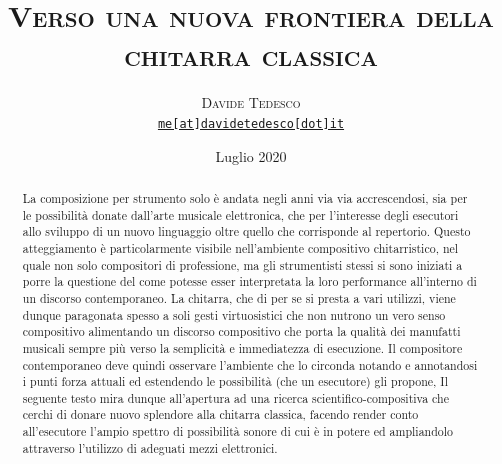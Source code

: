 \documentclass[oneside]{article}
\title{\vspace{-15mm}\fontsize{24pt}{10pt}\selectfont\textsf{\bfseries{\textsc{Verso una nuova frontiera della
 chitarra classica}}}} %
\author{
\large
\textsc{Davide Tedesco}\\
\small \href{mailto:me@davidetedesco.it}{\texttt{me[at]davidetedesco[dot]it}} 
}
\date{Luglio 2020}
\begin{document}
\maketitle %

\tableofcontents

\thispagestyle{empty} 

\vspace*{10mm}

\begin{abstract}

La composizione per strumento solo è andata negli anni via via accrescendosi, sia per le possibilità donate dall'arte musicale elettronica, che per l'interesse degli esecutori allo sviluppo di un nuovo linguaggio oltre quello che corrisponde al repertorio. Questo atteggiamento è particolarmente visibile nell'ambiente compositivo chitarristico, nel quale non solo compositori di professione, ma gli strumentisti stessi si sono iniziati a porre la questione del come potesse esser interpretata la loro performance all'interno di un discorso contemporaneo. La chitarra, che di per se si presta a vari utilizzi, viene dunque paragonata spesso a soli gesti virtuosistici che non nutrono un vero senso compositivo alimentando un discorso compositivo che porta la qualità dei manufatti musicali sempre più verso la semplicità e immediatezza di esecuzione. Il compositore contemporaneo deve quindi osservare l'ambiente che lo circonda notando e annotandosi i punti forza attuali ed estendendo le possibilità (che un esecutore) gli propone, Il seguente testo mira dunque all'apertura ad una ricerca scientifico-compositiva che cerchi di donare nuovo splendore alla chitarra classica, facendo render conto all'esecutore l'ampio spettro di possibilità sonore di cui è in potere ed ampliandolo attraverso l'utilizzo di adeguati mezzi elettronici.

\vspace*{4mm}
\end{abstract}

\hspace*{4mm}
\end{document}
